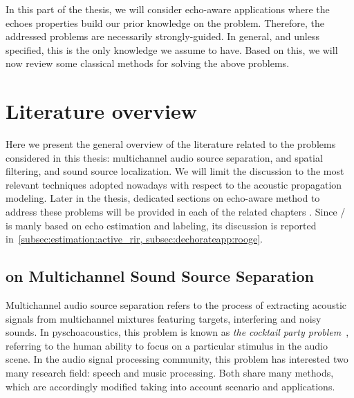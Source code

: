 \mynewline
In this part of the thesis, we will consider echo-aware applications where the echoes properties build our prior knowledge on the problem.
Therefore, the addressed problems are necessarily strongly-guided.
In general, and unless specified, this is the only knowledge we assume to have.
Based on this, we will now review some classical methods for solving the above problems.


\section{Literature overview}\label{sec:application:sota}
Here we present the general overview of the literature related to the problems considered in this thesis: multichannel audio source separation, and spatial filtering, and sound source localization.
We will limit the discussion to the most relevant techniques adopted nowadays with respect to the acoustic propagation modeling.
Later in the thesis, dedicated sections on echo-aware method to address these problems will be provided in each of the related chapters .
Since \RooGE/ is manly based on echo estimation and labeling, its discussion is reported in~\cref{subsec:estimation:active_rir, subsec:dechorateapp:rooge}.

\subsection{on Multichannel Sound Source Separation}
Multichannel audio source separation refers to the process of extracting acoustic signals from multichannel mixtures featuring targets, interfering and noisy sounds.
In pyschoacoustics, this problem is known as \textit{the cocktail party problem}~, referring to the human ability to focus on a particular stimulus in the audio scene.
In the audio signal processing community, this problem has interested two many research field: speech and music processing.
Both share many methods, which are accordingly modified taking into account scenario and applications.

